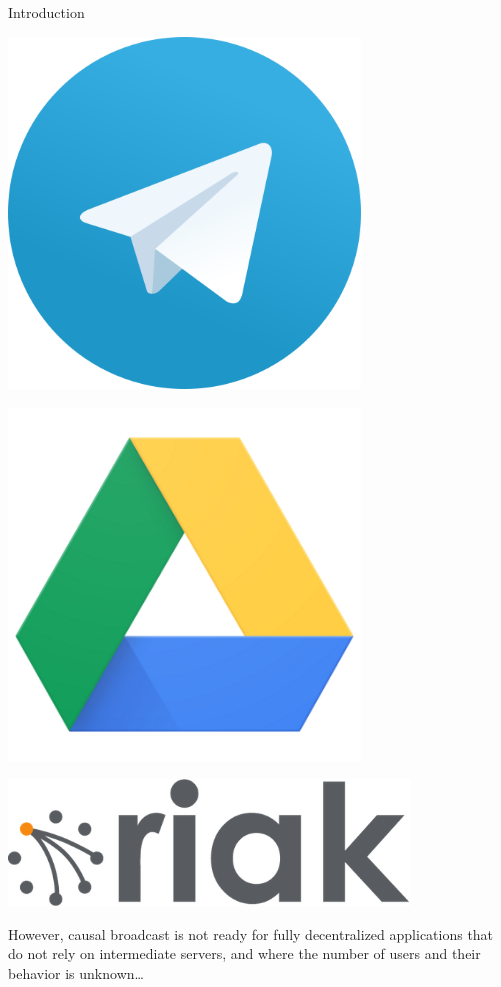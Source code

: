 \documentclass[10pt, xcolor={usenames, dvipsnames}]{beamer}
\begin{document}
\begin{frame}{Introduction}
\begin{minipage}{0.19\textwidth}
    \end{minipage}
    \begin{minipage}{0.19\textwidth}
      \centering
      \includegraphics[width=0.7\textwidth]{logos/telegram.png}
    \end{minipage}    
    \begin{minipage}{0.19\textwidth}
      \centering
      \includegraphics[width=0.7\textwidth]{logos/google.png}
    \end{minipage}
    \begin{minipage}{0.19\textwidth}
      \centering
      \includegraphics[width=0.8\textwidth]{logos/riak.png}
    \end{minipage}

    \vspace{2em}


    However, causal broadcast is not ready for fully decentralized applications
    that do not rely on intermediate servers, and where the number of users and
    their behavior is unknown\ldots

\end{frame}
\end{document}
